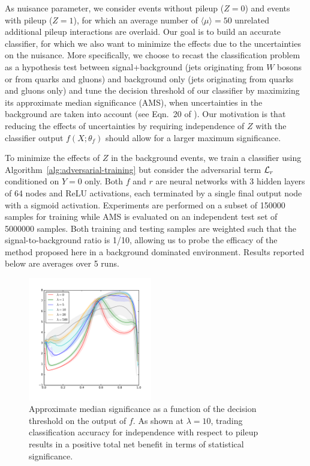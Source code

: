 \documentclass[twocolumn,superscriptaddress,aps]{revtex4-1}
\theoremstyle{plain}
\begin{document}
As nuisance parameter, we consider events without pileup ($Z=0$) and
events with pileup ($Z=1$), for which an average number of $\langle \mu \rangle =
50$ unrelated additional pileup interactions are overlaid. Our goal is to build an accurate
classifier, for which we also want to minimize the effects due to the
uncertainties on the nuisance. More specifically, we choose to recast the
classification problem as a hypothesis test between signal+background (jets
originating from $W$ bosons or from quarks and gluons) and background
only (jets originating from quarks and gluons only) and tune the decision
threshold of our classifier by maximizing its approximate median significance
(AMS), when uncertainties in the background are taken into account (see Eqn.~20
of \citep{adam2014higgs}). Our motivation is that reducing the effects of
uncertainties by requiring independence of $Z$ with the classifier output $f(X;\theta_f)$ should
allow for a larger maximum significance.

To minimize the effects of $Z$ in the background events, we train a classifier
using  Algorithm~\ref{alg:adversarial-training} but consider the adversarial
term ${\cal L}_r$ conditioned on $Y=0$ only. Both $f$ and $r$ are neural
networks with 3 hidden layers of 64 nodes and ReLU activations, each terminated
by a single final output node with a sigmoid activation. Experiments are performed
on a subset of 150000 samples for training while AMS is evaluated on an independent test set of 5000000
samples. Both training and testing samples are weighted such
that the signal-to-background ratio is 1/10, allowing us to probe the
efficacy of the method proposed here in a background dominated
environment. Results reported below are averages over 5 runs.

\begin{figure}
    \includegraphics[width=0.48\textwidth]{figures/ams.pdf}
    \vspace{-1cm}
    \caption{Approximate median significance as a function of the decision threshold
             on the output of $f$.  As shown at $\lambda=10$, trading
             classification accuracy for independence with respect to pileup
             results in a positive total net benefit in terms of statistical significance.}
    \label{fig:physics-ams}
\end{figure}
\end{document}
